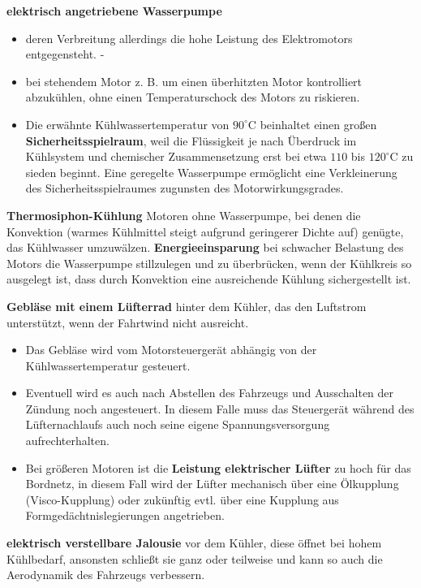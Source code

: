 \textbf{elektrisch angetriebene Wasserpumpe}

\begin{itemize}
\item
  deren Verbreitung allerdings die hohe Leistung des Elektromotors
  entgegensteht. -
\item
  bei stehendem Motor z. B. um einen überhitzten Motor kontrolliert
  abzukühlen, ohne einen Temperaturschock des Motors zu riskieren.
\item
  Die erwähnte Kühlwassertemperatur von $90^\circ \text{C}$ beinhaltet
  einen großen \textbf{Sicherheitsspielraum}, weil die Flüssigkeit je
  nach Überdruck im Kühlsystem und chemischer Zusammensetzung erst bei
  etwa $110$ bis $120^\circ \text{C}$ zu sieden beginnt. Eine
  geregelte Wasserpumpe ermöglicht eine Verkleinerung des
  Sicherheitsspielraumes zugunsten des Motorwirkungsgrades.
\end{itemize}

\textbf{Thermosiphon-Kühlung} Motoren ohne Wasserpumpe, bei denen die
Konvektion (warmes Kühlmittel steigt aufgrund geringerer Dichte auf)
genügte, das Kühlwasser umzuwälzen. \textbf{Energieeinsparung} bei
schwacher Belastung des Motors die Wasserpumpe stillzulegen und zu
überbrücken, wenn der Kühlkreis so ausgelegt ist, dass durch Konvektion
eine ausreichende Kühlung sichergestellt ist.

\textbf{Gebläse mit einem Lüfterrad} hinter dem Kühler, das den
Luftstrom unterstützt, wenn der Fahrtwind nicht ausreicht.

\begin{itemize}
\item
  Das Gebläse wird vom Motorsteuergerät abhängig von der
  Kühlwassertemperatur gesteuert.
\item
  Eventuell wird es auch nach Abstellen des Fahrzeugs und Ausschalten
  der Zündung noch angesteuert. In diesem Falle muss das Steuergerät
  während des Lüfternachlaufs auch noch seine eigene Spannungsversorgung
  aufrechterhalten.
\item
  Bei größeren Motoren ist die \textbf{Leistung elektrischer Lüfter} zu
  hoch für das Bordnetz, in diesem Fall wird der Lüfter mechanisch über
  eine Ölkupplung (Visco-Kupplung) oder zukünftig evtl. über eine
  Kupplung aus Formgedächtnislegierungen angetrieben.
\end{itemize}

\textbf{elektrisch verstellbare Jalousie} vor dem Kühler, diese öffnet
bei hohem Kühlbedarf, ansonsten schließt sie ganz oder teilweise und
kann so auch die Aerodynamik des Fahrzeugs verbessern.

